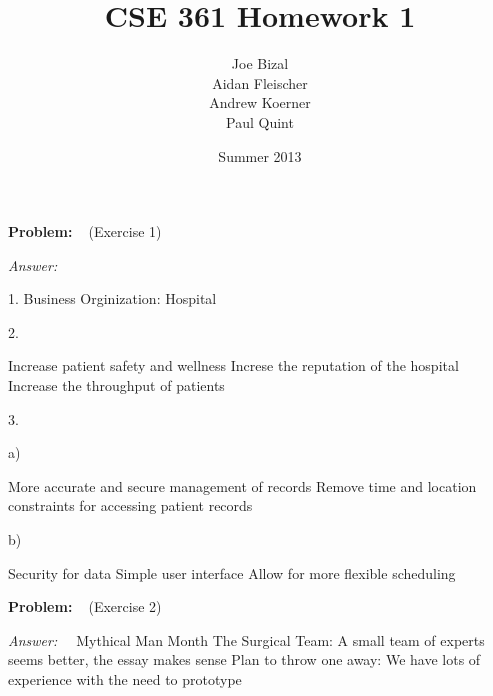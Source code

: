 \documentclass{article}
\title{CSE 361 Homework 1}
\author{
	Joe Bizal\\
	Aidan Fleischer\\
	Andrew Koerner\\
	Paul Quint\\
}
\date{Summer 2013}
\newcommand{\problem}{\vspace{.5cm}\textbf{Problem:~~}}
\newcommand{\answer}{\vspace{.25cm}\emph{Answer:~~}}
\begin{document}
\maketitle

\newpage

\problem (Exercise 1)

\answer

1. Business Orginization: Hospital

2.

Increase patient safety and wellness
Increse the reputation of the hospital
Increase the throughput of patients

3.

a)

More accurate and secure management of records
Remove time and location constraints for accessing patient records

b)

Security for data
Simple user interface
Allow for more flexible scheduling

\problem (Exercise 2)

\answer
Mythical Man Month
The Surgical Team: A small team of experts seems better, the essay makes sense
Plan to throw one away: We have lots of experience with the need to prototype
\end{document}
